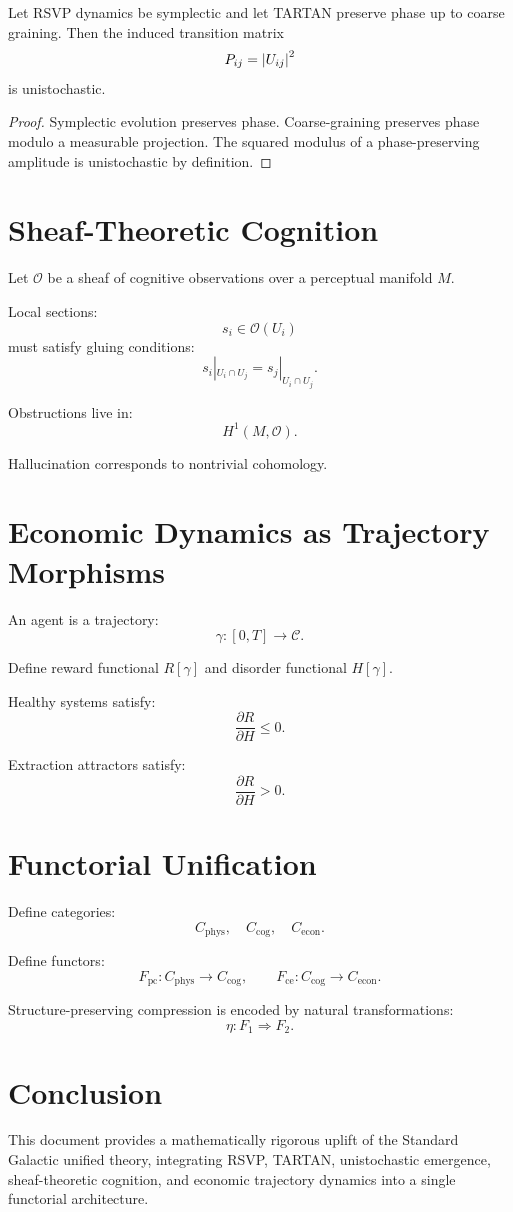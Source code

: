 \documentclass[11pt]{article}
\begin{document}
\begin{theorem}
Let RSVP dynamics be symplectic and let TARTAN preserve phase up to coarse
graining. Then the induced transition matrix
\[
P_{ij} = \abs{U_{ij}}^2
\]
is unistochastic.
\end{theorem}

\begin{proof}
Symplectic evolution preserves phase. Coarse-graining preserves phase modulo
a measurable projection. The squared modulus of a phase-preserving amplitude
is unistochastic by definition.
\end{proof}

\section{Sheaf-Theoretic Cognition}

Let $\mathcal{O}$ be a sheaf of cognitive observations over a perceptual
manifold $M$.

Local sections:
\[
s_i \in \mathcal{O}(U_i)
\]
must satisfy gluing conditions:
\[
s_i|_{U_i\cap U_j} = s_j|_{U_i\cap U_j}.
\]

Obstructions live in:
\[
H^1(M, \mathcal{O}).
\]

Hallucination corresponds to nontrivial cohomology.

\section{Economic Dynamics as Trajectory Morphisms}

An agent is a trajectory:
\[
\gamma : [0,T] \to \mathcal{C}.
\]

Define reward functional $R[\gamma]$ and disorder functional $H[\gamma]$.

Healthy systems satisfy:
\[
\frac{\partial R}{\partial H} \le 0.
\]

Extraction attractors satisfy:
\[
\frac{\partial R}{\partial H} > 0.
\]

\section{Functorial Unification}

Define categories:
\[
C_{\mathrm{phys}},\quad C_{\mathrm{cog}},\quad C_{\mathrm{econ}}.
\]

Define functors:
\[
F_{\mathrm{pc}} : C_{\mathrm{phys}} \to C_{\mathrm{cog}},\qquad
F_{\mathrm{ce}} : C_{\mathrm{cog}} \to C_{\mathrm{econ}}.
\]

Structure-preserving compression is encoded by natural transformations:
\[
\eta : F_1 \Rightarrow F_2.
\]

\section{Conclusion}

This document provides a mathematically rigorous uplift of the Standard
Galactic unified theory, integrating RSVP, TARTAN, unistochastic emergence,
sheaf-theoretic cognition, and economic trajectory dynamics into a single
functorial architecture.
\end{document}
